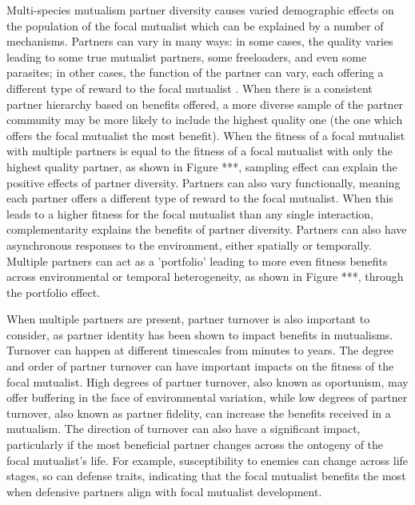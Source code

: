 \documentclass[12pt,a4paper]{article}
\begin{document}
Multi-species mutualism partner diversity causes varied demographic effects on the population of the focal mutualist which can be explained by a number of mechanisms.
Partners can vary in many ways: in some cases, the quality varies leading to some true mutualist partners, some freeloaders, and even some parasites\cite{Bronstein1994, Afkhami2014,Song2020,West2007,Frederickson2013}; in other cases, the function of the partner can vary, each offering a different type of reward to the focal mutualist \cite{Stanton2003}.
When there is a consistent partner hierarchy based on benefits offered, a more diverse sample of the partner community may be more likely to include the highest quality one\cite{Frederickson2013} (the one which offers the focal mutualist the most benefit).
When the fitness of a focal mutualist with multiple partners is equal to the fitness of a focal mutualist with only the highest quality partner, as shown in Figure ***, sampling effect can explain the positive effects of partner diversity\cite{Batstone2018}. 
Partners can also vary functionally, meaning each partner offers a different type of reward to the focal mutualist\cite{Stachowicz2005,Bronstein2006,Stanton2003}.
When this leads to a higher fitness for the focal mutualist than any single interaction, complementarity explains the benefits of partner diversity\cite{Batstone2018}. 
Partners can also have asynchronous responses to the environment, either spatially\cite{Ollerton2006} or temporally\cite{Alarcon2008}.
Multiple partners can act as a 'portfolio' leading to more even fitness benefits across environmental or temporal heterogeneity, as shown in Figure ***, through the portfolio effect\cite{Batstone2018,Lazaro2022}.

When multiple partners are present, partner turnover is also important to consider, as partner identity has been shown to impact benefits in mutualisms\cite{Djieto-Lordon2005}. 
Turnover can happen at different timescales\cite{Oliveira1999,Horvitz1986} from minutes to years. 
The degree and order of partner turnover can have important impacts on the fitness of the focal mutualist.
High degrees of partner turnover, also known as oportunism, may offer buffering in the face of environmental variation\cite{Hegland2009}, while low degrees of partner turnover, also known as partner fidelity, can increase the benefits received in a mutualism\cite{Sachs2004}.
The direction of turnover can also have a significant impact, particularly if the most beneficial partner changes across the ontogeny of the focal mutualist's life\cite{Fonseca2003}.
For example, susceptibility to enemies can change across life stages\cite{Boege2005}, so can defense traits, indicating that the focal mutualist benefits the most when defensive partners align with focal mutualist development\cite{Djieto-Lordon2005}. 
\end{document}
